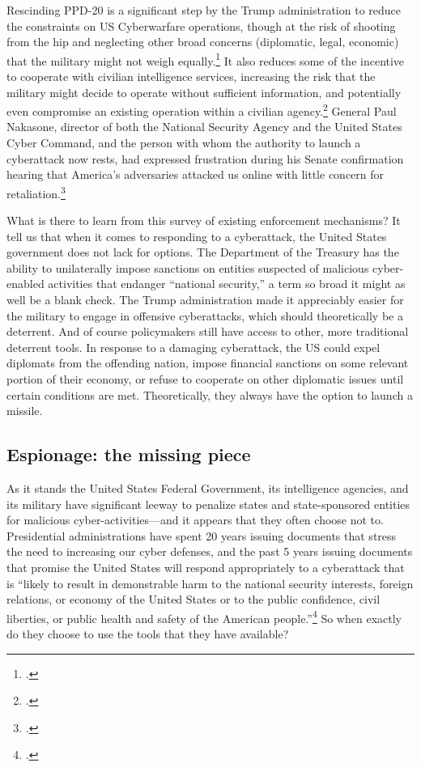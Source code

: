 \documentclass{report}
\begin{document}
\begin{refsegment}
Rescinding PPD-20 is a significant step by the Trump administration to reduce the constraints on US Cyberwarfare operations, though at the risk of shooting from the hip and neglecting other broad concerns (diplomatic, legal, economic) that the military might not weigh equally.\footcite{starks_ramifications_2018} It also reduces some of the incentive to cooperate with civilian intelligence services, increasing the risk that the military might decide to operate without sufficient information, and potentially even compromise an existing operation within a civilian agency.\footcite{hawkins_cybersecurity_2018} General Paul Nakasone, director of both the National Security Agency and the United States Cyber Command, and the person with whom the authority to launch a cyberattack now rests, had expressed frustration during his Senate confirmation hearing that America's adversaries attacked us online with little concern for retaliation.\footcite{sanger_trump_2018}

What is there to learn from this survey of existing enforcement mechanisms? It tell us that when it comes to responding to a cyberattack, the United States government does not lack for options. The Department of the Treasury has the ability to unilaterally impose sanctions on entities suspected of malicious cyber-enabled activities that endanger ``national security,'' a term so broad it might as well be a blank check. The Trump administration made it appreciably easier for the military to engage in offensive cyberattacks, which should theoretically be a deterrent. And of course policymakers still have access to other, more traditional deterrent tools. In response to a damaging cyberattack, the US could expel diplomats from the offending nation, impose financial sanctions on some relevant portion of their economy, or refuse to cooperate on other diplomatic issues until certain conditions are met. Theoretically, they always have the option to launch a missile.

\subsection{Espionage: the missing piece}
As it stands the United States Federal Government, its intelligence agencies, and its military have significant leeway to penalize states and state-sponsored entities for malicious cyber-activities---and it appears that they often choose not to. Presidential administrations have spent 20 years issuing documents that stress the need to increasing our cyber defenses, and the past 5 years issuing documents that promise the United States will respond appropriately to a cyberattack that is ``likely to result in demonstrable harm to the national security interests, foreign relations, or economy of the United States or to the public confidence, civil liberties, or public health and safety of the American people.''\footcite{office_of_the_press_secretary_fact_2016} So when exactly do they choose to use the tools that they have available?


\end{refsegment}
\end{document}
